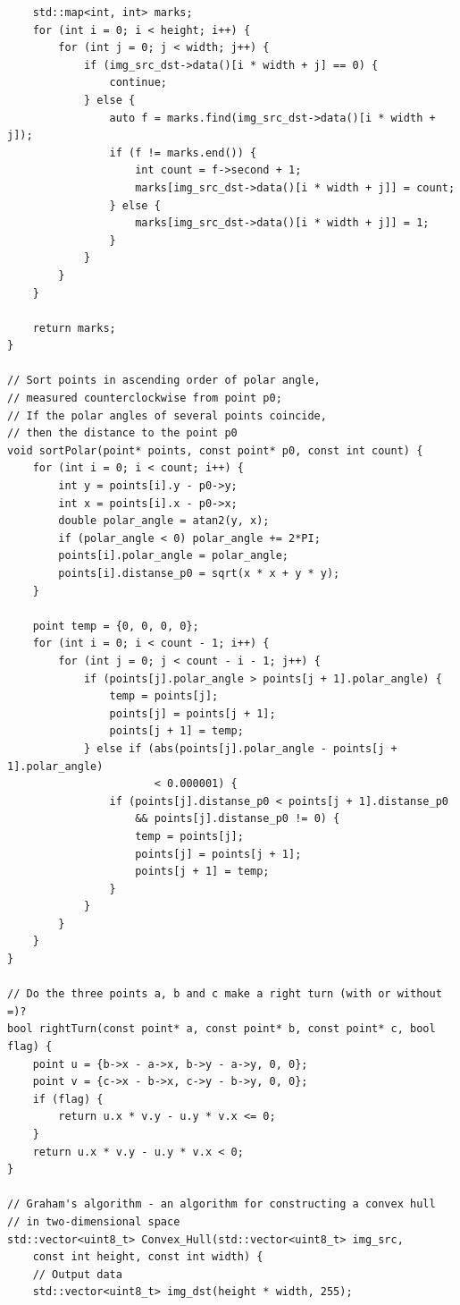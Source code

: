 \documentclass{report}
\begin{document}
\begin{lstlisting}
    std::map<int, int> marks;
    for (int i = 0; i < height; i++) {
        for (int j = 0; j < width; j++) {
            if (img_src_dst->data()[i * width + j] == 0) {
                continue;
            } else {
                auto f = marks.find(img_src_dst->data()[i * width + j]);
                if (f != marks.end()) {
                    int count = f->second + 1;
                    marks[img_src_dst->data()[i * width + j]] = count;
                } else {
                    marks[img_src_dst->data()[i * width + j]] = 1;
                }
            }
        }
    }

    return marks;
}

// Sort points in ascending order of polar angle,
// measured counterclockwise from point p0;
// If the polar angles of several points coincide,
// then the distance to the point p0
void sortPolar(point* points, const point* p0, const int count) {
    for (int i = 0; i < count; i++) {
        int y = points[i].y - p0->y;
        int x = points[i].x - p0->x;
        double polar_angle = atan2(y, x);
        if (polar_angle < 0) polar_angle += 2*PI;
        points[i].polar_angle = polar_angle;
        points[i].distanse_p0 = sqrt(x * x + y * y);
    }

    point temp = {0, 0, 0, 0};
    for (int i = 0; i < count - 1; i++) {
        for (int j = 0; j < count - i - 1; j++) {
            if (points[j].polar_angle > points[j + 1].polar_angle) {
                temp = points[j];
                points[j] = points[j + 1];
                points[j + 1] = temp;
            } else if (abs(points[j].polar_angle - points[j + 1].polar_angle)
                       < 0.000001) {
                if (points[j].distanse_p0 < points[j + 1].distanse_p0
                    && points[j].distanse_p0 != 0) {
                    temp = points[j];
                    points[j] = points[j + 1];
                    points[j + 1] = temp;
                }
            }
        }
    }
}

// Do the three points a, b and c make a right turn (with or without =)?
bool rightTurn(const point* a, const point* b, const point* c, bool flag) {
    point u = {b->x - a->x, b->y - a->y, 0, 0};
    point v = {c->x - b->x, c->y - b->y, 0, 0};
    if (flag) {
        return u.x * v.y - u.y * v.x <= 0;
    }
    return u.x * v.y - u.y * v.x < 0;
}

// Graham's algorithm - an algorithm for constructing a convex hull
// in two-dimensional space
std::vector<uint8_t> Convex_Hull(std::vector<uint8_t> img_src,
    const int height, const int width) {
    // Output data
    std::vector<uint8_t> img_dst(height * width, 255);


\end{lstlisting}
\end{document}
